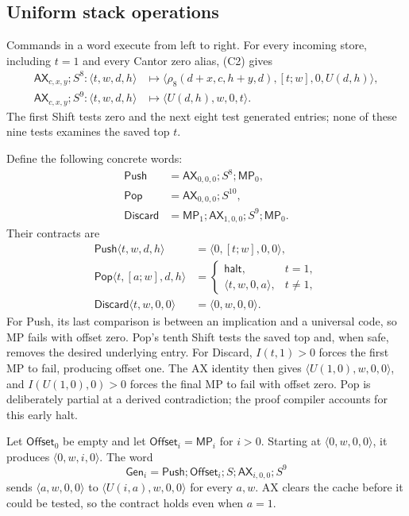 \subsection{Uniform stack operations}

Commands in a word execute from left to right. For every incoming store,
including $t=1$ and every Cantor zero alias, (C2) gives
\begin{align*}
 \mathsf{AX}_{c,x,y};S^8:
 \langle t,w,d,h\rangle
 &\longmapsto\langle\rho_8(d+x,c,h+y,d),[t;w],0,U(d,h)\rangle,\\
 \mathsf{AX}_{c,x,y};S^9:
 \langle t,w,d,h\rangle
 &\longmapsto\langle U(d,h),w,0,t\rangle.
\end{align*}
The first Shift tests zero and the next eight test generated entries;
none of these nine tests examines the saved top $t$.

Define the following concrete words:
\begin{align*}
 \mathsf{Push}&=\mathsf{AX}_{0,0,0};S^8;\mathsf{MP}_0,\\
 \mathsf{Pop}&=\mathsf{AX}_{0,0,0};S^{10},\\
 \mathsf{Discard}&=\mathsf{MP}_1;\mathsf{AX}_{1,0,0};S^9;\mathsf{MP}_0.
\end{align*}
Their contracts are
\begin{align*}
 \mathsf{Push}\langle t,w,d,h\rangle
 &=\langle0,[t;w],0,0\rangle,\\
 \mathsf{Pop}\langle t,[a;w],d,h\rangle
 &=\begin{cases}
   \mathsf{halt},&t=1,\\
   \langle t,w,0,a\rangle,&t\ne1,
  \end{cases}\\
 \mathsf{Discard}\langle t,w,0,0\rangle&=\langle0,w,0,0\rangle.
\end{align*}
For Push, its last comparison is between an implication and a universal
code, so MP fails with offset zero. Pop's tenth Shift tests the saved top
and, when safe, removes the desired underlying entry. For Discard,
$I(t,1)>0$ forces the first MP to fail, producing offset one. The AX identity
then gives $\langle U(1,0),w,0,0\rangle$, and $I(U(1,0),0)>0$ forces
the final MP to fail with offset zero. Pop is deliberately partial at a
derived contradiction; the proof compiler accounts for this early halt.

Let $\mathsf{Offset}_0$ be empty and let $\mathsf{Offset}_i=\mathsf{MP}_i$
for $i>0$. Starting at $\langle0,w,0,0\rangle$, it produces
$\langle0,w,i,0\rangle$. The word
\[
 \mathsf{Gen}_i=\mathsf{Push};\mathsf{Offset}_i;S;
                    \mathsf{AX}_{i,0,0};S^9
\]
sends $\langle a,w,0,0\rangle$ to $\langle U(i,a),w,0,0\rangle$ for
every $a,w$. AX clears the cache before it could be tested, so the contract
holds even when $a=1$.


